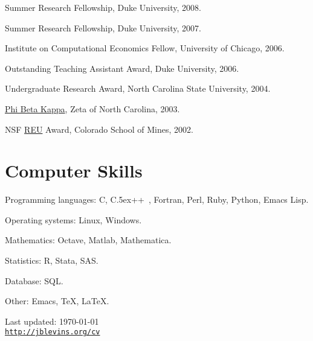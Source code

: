 \documentclass[11pt,letterpaper]{article}
\renewenvironment{itemize}{
  \begin{list}{}
    { \setlength{\itemsep}{5pt}
      \setlength{\parsep}{0pt}
      \setlength{\topsep}{0pt}
      \setlength{\leftmargin}{0em} } }{
  \end{list}}
\def\Cplusplus{C{\raise.5ex\hbox{\footnotesize ++ }}}
\begin{document}
\begin{itemize}
\item Summer Research Fellowship, Duke University, 2008.
\item Summer Research Fellowship, Duke University, 2007.
\item Institute on Computational Economics Fellow, University of Chicago, 2006.
\item Outstanding Teaching Assistant Award, Duke University, 2006.
\item Undergraduate Research Award, North Carolina State University, 2004.
\item \href{http://www.pbk.org/}{Phi Beta Kappa}, Zeta of North Carolina, 2003.
\item NSF \href{http://www.nsf.gov/crssprgm/reu/}{REU} Award,
  Colorado School of Mines, 2002.
\end{itemize}

\section*{Computer Skills}

\begin{itemize}
\item Programming languages: C, \Cplusplus, Fortran, Perl, Ruby, Python,
  Emacs Lisp.
\item Operating systems: Linux, Windows.
\item Mathematics: Octave, Matlab, Mathematica.
\item Statistics: R, Stata, SAS.
\item Database: SQL.
\item Other: Emacs, \TeX, \LaTeX.
\end{itemize}

\bigskip

\begin{center}
\begin{footnotesize}
Last updated: \today \\
\href{http://jblevins.org/cv}{\tt http://jblevins.org/cv}
\end{footnotesize}
\end{center}
\end{document}

